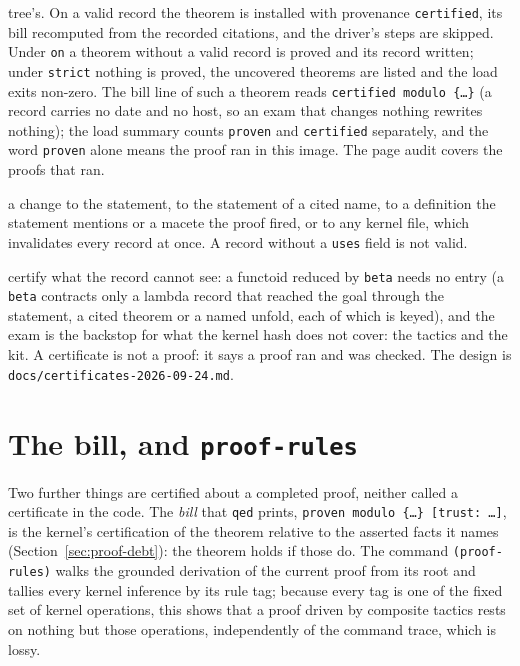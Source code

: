 \begin{description}
  tree's.  On a valid record the theorem is installed with provenance
  \texttt{certified}, its bill recomputed from the recorded citations, and
  the driver's steps are skipped.  Under \texttt{on} a theorem without a
  valid record is proved and its record written; under \texttt{strict}
  nothing is proved, the uncovered theorems are listed and the load exits
  non-zero.  The bill line of such a theorem reads \texttt{certified modulo
  \{\ldots\}} (a record carries no date and no host, so an exam that changes
  nothing rewrites nothing); the load summary counts \texttt{proven} and
  \texttt{certified} separately, and the word \texttt{proven} alone means
  the proof ran in this image.  The page audit covers the proofs that ran.
\item[Invalidated by] a change to the statement, to the statement of a
  cited name, to a definition the statement mentions or a macete the proof
  fired, or to any kernel file, which invalidates every record at once.  A
  record without a \texttt{uses} field is not valid.
\item[Does not] certify what the record cannot see: a functoid reduced by
  \texttt{beta} needs no entry (a \texttt{beta} contracts only a lambda record
  that reached the goal through the statement, a cited theorem or a named
  unfold, each of which is keyed), and the exam is the backstop for what
  the kernel hash does not cover: the tactics and the kit.  A certificate is not a proof:
  it says a proof ran and was checked.  The design is
  \texttt{docs/certificates-2026-09-24.md}.
\end{description}

\section{The bill, and \texttt{proof-rules}}\label{sec:bill}

Two further things are certified about a completed proof, neither called
a certificate in the code.  The \emph{bill} that \texttt{qed} prints,
\texttt{proven modulo \{\ldots\} [trust: \ldots]}, is the kernel's
certification of the theorem relative to the asserted facts it names
(Section~\ref{sec:proof-debt}): the theorem holds if those do.  The
command \texttt{(proof-rules)} walks the grounded derivation of the
current proof from its root and tallies every kernel inference by its
rule tag; because every tag is one of the fixed set of kernel operations,
this shows that a proof driven by composite tactics rests on nothing but
those operations, independently of the command trace, which is lossy.

